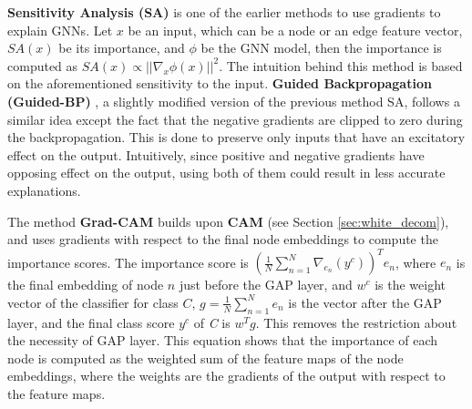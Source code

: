\textbf{Sensitivity Analysis (SA)} \cite{guided-bp} is one of the earlier methods to use gradients to explain GNNs. Let $x$ be an input, which can be a node or an edge feature vector, $SA(x)$ be its importance, and $\phi$ be the GNN model, then the importance is computed as $SA(x) \propto ||\nabla_{x} \phi(x)||^{2}$. The intuition behind this method is based on the aforementioned sensitivity to the input. \textbf{Guided Backpropagation (Guided-BP)} \cite{guided-bp}, a slightly modified version of the previous method SA, follows a similar idea except the fact that the negative gradients are clipped to zero during the backpropagation. This is done to preserve only inputs that have an excitatory effect on the output. Intuitively, since positive and negative gradients have opposing effect on the output, using both of them could result in less accurate explanations.


The method \textbf{Grad-CAM} \cite{Excitation-BP} builds upon \textbf{CAM} \cite{Excitation-BP} (see Section \ref{sec:white_decom}), and uses gradients with respect to the final node embeddings to compute the importance scores.  The importance score is $(\frac{1}{N}\sum_{n=1}^{N}\nabla_{e_n}(y^c))^Te_n$, where $e_n$ is the final embedding of node $n$ just before the GAP layer, and $w^c$ is the weight vector of the classifier for class $C$, $g = \frac{1}{N} \sum_{n=1}^{N} e_n$ is the vector after the GAP layer, and the final class score $y^c$ of \textit{C} is $w^Tg$.
This removes the restriction about the necessity of GAP layer. This equation shows that the importance of each node is computed as the weighted sum of the feature maps of the node embeddings, where the weights are the gradients of the output with respect to the feature maps.

